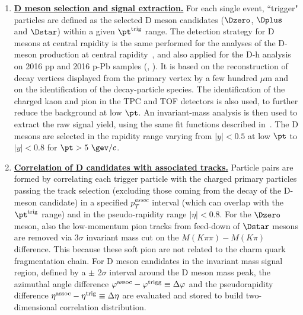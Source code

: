 \begin{enumerate}
\item
\underline {\bf D meson selection and signal extraction.}  For each single event, ``trigger" particles
are defined as the selected  D meson candidates ($\Dzero$, $\Dplus$ and $\Dstar$)
within a given $\pt^{\rm trig}$ range. The detection strategy for D mesons at central rapidity is
the same performed for the analyses of the D-meson production at central rapidity~\cite{ALICEDmespp7Tev}, and also applied for the D-h analysis on 2016 pp and 2016 p-Pb samples (\cite{Notepp}, \cite{NotepPb}). It is based on the reconstruction of decay
vertices displayed from the primary vertex by a few hundred $\mu$m and on the identification of the decay-particle species.
The identification of the charged kaon and pion in the TPC and TOF detectors is also used, to further reduce the background at low $\pt$. An invariant-mass analysis is then used to extract the raw signal yield, using the same fit functions described in~\cite{ALICEDhcorr}.
The D mesons are selected in the rapidity range varying from $|y|<0.5$ at low $\pt$ to $|y|<0.8$ for $\pt>5~\gev/c$. %

\item
\underline{\bf Correlation of D candidates with associated tracks.}
Particle pairs are formed by correlating each trigger particle with the charged primary particles passing the track selection (excluding those coming from the decay of the D-meson candidate) in a specified $p^{assoc}_{T}$ interval (which can overlap with the $\pt^{\rm trig}$ range) and in the pseudo-rapidity range $|\eta|<0.8$. For the $\Dzero$ meson, also the low-momentum pion tracks from feed-down of $\Dstar$ mesons are removed via 3$\sigma$ invariant mass cut on the $M(K\pi\pi)-M(K\pi)$ difference. This because these soft pion are not related to the charm quark fragmentation chain.
For D meson candidates in the invariant mass signal region, defined by a $\pm$ 2$\sigma$ interval around the D meson mass peak, the azimuthal angle difference $\varphi^{\rm assoc}-\varphi^{\rm trigg}\equiv\Delta\varphi$
and the pseudorapidity difference $\eta^{\rm assoc}-\eta^{\rm trig}\equiv\Delta \eta$ are evaluated and stored to build two-dimensional correlation distribution. %


\end{enumerate}

